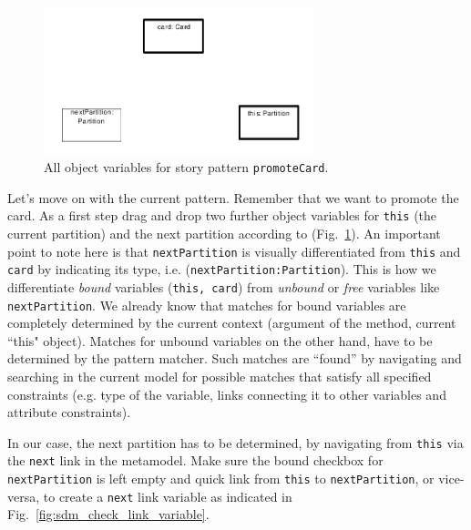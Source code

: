 \begin{figure}[htbp]
\begin{center}
  \includegraphics[width=0.7\textwidth]{pics/sdmBilder/check/sdm25}
  \caption{All object variables for story pattern \texttt{promoteCard}.}  
  \label{fig:sdm_check_complete_sp}
\end{center}
\end{figure}

Let's move on with the current pattern. Remember that we want to promote the
card.  As a first step drag and drop two further object variables for
\texttt{this} (the current partition) and the next partition according to
(Fig.~\ref{fig:sdm_check_complete_sp}).  An important point to note here is
that \texttt{nextPartition} is visually differentiated from \texttt{this} and
\texttt{card} by indicating its type, i.e. (\texttt{nextPartition:Partition}). 
This is how we differentiate \emph{bound} variables (\texttt{this, card}) from
\emph{unbound} or \emph{free} variables like \texttt{nextPartition}.  We already
know that matches for bound variables are completely determined by the current
context (argument of the method, current ``this" object).  Matches for unbound
variables on the other hand, have to be determined by the pattern matcher.  Such
matches are ``found'' by navigating and searching in the current model for
possible matches that satisfy all specified constraints (e.g. type of the
variable, links connecting it to other variables and attribute constraints).  

In our case, the next partition has to be determined, by navigating from
\texttt{this} via the \texttt{next} link in the metamodel.  Make sure the bound
checkbox for \texttt{nextPartition} is left empty and quick link from
\texttt{this} to \texttt{nextPartition}, or vice-versa, to create a
\texttt{next} link variable as indicated in
Fig.~\ref{fig:sdm_check_link_variable}. 

\clearpage

